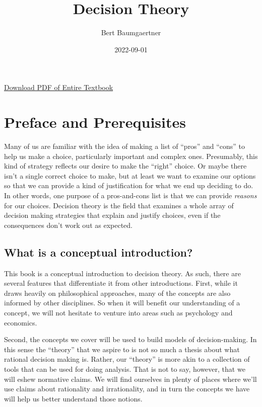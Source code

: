 \documentclass[]{tufte-book}
\title{Decision Theory}
\author{Bert Baumgaertner}
\date{2022-09-01}
\begin{document}
\maketitle



{
\setcounter{tocdepth}{0}
\tableofcontents
}

\href{decisiontheory.pdf}{Download PDF of Entire Textbook}

\hypertarget{preface-and-prerequisites}{%
\chapter*{Preface and Prerequisites}\label{preface-and-prerequisites}}

Many of us are familiar with the idea of making a list of ``pros'' and ``cons'' to help us make a choice, particularly important and complex ones. Presumably, this kind of strategy reflects our desire to make the ``right'' choice. Or maybe there isn't a single correct choice to make, but at least we want to examine our options so that we can provide a kind of justification for what we end up deciding to do. In other words, one purpose of a pros-and-cons list is that we can provide \emph{reasons} for our choices. Decision theory is the field that examines a whole array of decision making strategies that explain and justify choices, even if the consequences don't work out as expected.

\hypertarget{what-is-a-conceptual-introduction}{%
\section{What is a conceptual introduction?}\label{what-is-a-conceptual-introduction}}

This book is a conceptual introduction to decision theory. As such, there are several features that differentiate it from other introductions. First, while it draws heavily on philosophical approaches, many of the concepts are also informed by other disciplines. So when it will benefit our understanding of a concept, we will not hesitate to venture into areas such as psychology and economics.

Second, the concepts we cover will be used to build models of decision-making. In this sense the ``theory'' that we aspire to is not so much a thesis about what rational decision making is. Rather, our ``theory'' is more akin to a collection of tools that can be used for doing analysis. That is not to say, however, that we will eshew normative claims. We will find ourselves in plenty of places where we'll use claims about rationality and irrationality, and in turn the concepts we have will help us better understand those notions.
\end{document}
